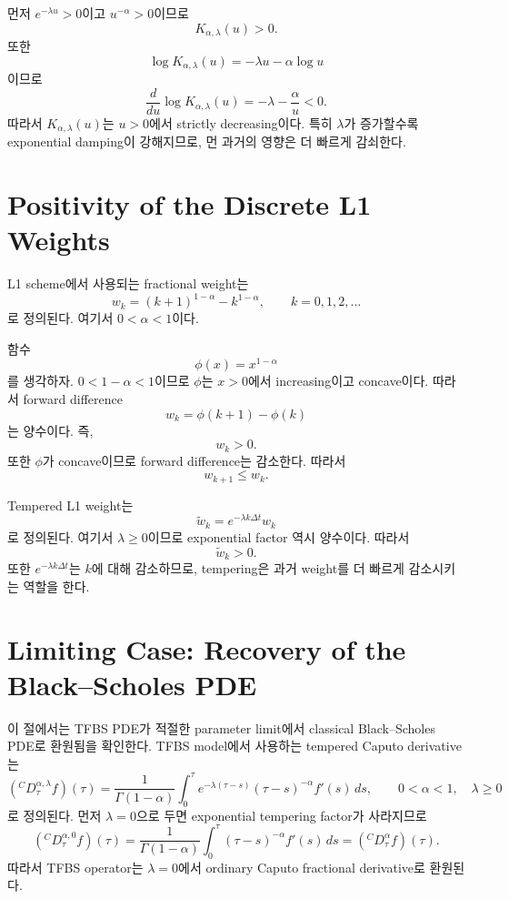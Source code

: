 \documentclass[11pt,a4paper]{report}
\begin{document}
먼저 $e^{-\lambda u}>0$이고 $u^{-\alpha}>0$이므로
\[
K_{\alpha,\lambda}(u)>0.
\]
또한
\[
\log K_{\alpha,\lambda}(u)
=
-\lambda u-\alpha\log u
\]
이므로
\[
\frac{d}{du}\log K_{\alpha,\lambda}(u)
=
-\lambda-\frac{\alpha}{u}<0.
\]
따라서 $K_{\alpha,\lambda}(u)$는 $u>0$에서 strictly decreasing이다. 특히 $\lambda$가 증가할수록 exponential damping이 강해지므로, 먼 과거의 영향은 더 빠르게 감쇠한다.

\section{Positivity of the Discrete L1 Weights}

L1 scheme에서 사용되는 fractional weight는
\[
w_k
=
(k+1)^{1-\alpha}-k^{1-\alpha},
\qquad k=0,1,2,\dots
\]
로 정의된다. 여기서 $0<\alpha<1$이다.

함수
\[
\phi(x)=x^{1-\alpha}
\]
를 생각하자. $0<1-\alpha<1$이므로 $\phi$는 $x>0$에서 increasing이고 concave이다. 따라서 forward difference
\[
w_k
=
\phi(k+1)-\phi(k)
\]
는 양수이다. 즉,
\[
w_k>0.
\]
또한 $\phi$가 concave이므로 forward difference는 감소한다. 따라서
\[
w_{k+1}\le w_k.
\]

Tempered L1 weight는
\[
\widetilde w_k
=
e^{-\lambda k\Delta t}w_k
\]
로 정의된다. 여기서 $\lambda\ge0$이므로 exponential factor 역시 양수이다. 따라서
\[
\widetilde w_k>0.
\]
또한 $e^{-\lambda k\Delta t}$는 $k$에 대해 감소하므로, tempering은 과거 weight를 더 빠르게 감소시키는 역할을 한다.









\section{Limiting Case: Recovery of the Black--Scholes PDE}
\label{app:bs_limit}

이 절에서는 TFBS PDE가 적절한 parameter limit에서 classical Black--Scholes PDE로 환원됨을 확인한다. 
TFBS model에서 사용하는 tempered Caputo derivative는
\[
({}^C D_\tau^{\alpha,\lambda} f)(\tau)
=
\frac{1}{\Gamma(1-\alpha)}
\int_0^\tau
e^{-\lambda(\tau-s)}
(\tau-s)^{-\alpha}
f'(s)\,ds,
\qquad 0<\alpha<1,\quad \lambda\ge0
\]
로 정의된다. 먼저 \(\lambda=0\)으로 두면 exponential tempering factor가 사라지므로
\[
({}^C D_\tau^{\alpha,0} f)(\tau)
=
\frac{1}{\Gamma(1-\alpha)}
\int_0^\tau
(\tau-s)^{-\alpha}
f'(s)\,ds
=
({}^C D_\tau^\alpha f)(\tau).
\]
따라서 TFBS operator는 \(\lambda=0\)에서 ordinary Caputo fractional derivative로 환원된다.
\end{document}
